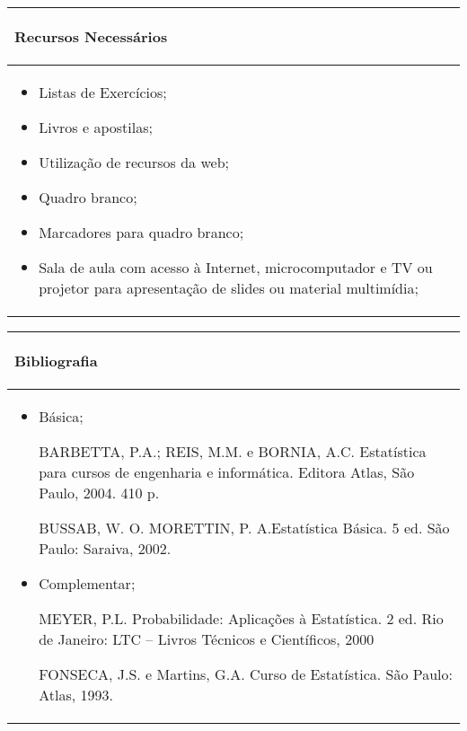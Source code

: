 \begin{table}[h]
\centering
\begin{small} 
 
\setlength{\tabcolsep}{3pt} 
\begin{tabular}{|p{15cm}|}\hline

\begin{center}\textbf{Recursos Necessários}\end{center}\\ \hline
\begin{itemize} 
  \item Listas de Exercícios;
  \item Livros e apostilas;
  \item Utilização de recursos da web;
  \item Quadro branco;
  \item Marcadores para quadro branco;
  \item Sala de aula com acesso à Internet, microcomputador e TV ou projetor para apresentação de slides ou material multimídia;
\end{itemize}
 \\ \hline

\end{tabular} 
\end{small}
\label{dadosinstituicao}
\end{table}


\begin{table}[h]
\centering
\begin{small} 
\setlength{\tabcolsep}{3pt} 
\begin{tabular}{|p{15cm}|}\hline

\begin{center}\textbf{Bibliografia}\end{center}\\ \hline
\begin{itemize} 
  \item Básica;
  
  BARBETTA, P.A.; REIS, M.M. e BORNIA, A.C. Estatística para cursos de engenharia e informática. Editora Atlas, São Paulo, 2004. 410 p.
  
  BUSSAB, W. O. MORETTIN, P. A.Estatística Básica.  5 ed.  São Paulo: Saraiva, 2002.
  
  
  \item Complementar;
  
  MEYER, P.L. Probabilidade: Aplicações à Estatística. 2 ed.  Rio de Janeiro: LTC – Livros Técnicos e Científicos, 2000
  
  FONSECA, J.S. e Martins, G.A. Curso de Estatística. São Paulo: Atlas, 1993.
\end{itemize}
 \\ \hline

\end{tabular} 
\end{small}
\label{dadosinstituicao}
\end{table}
